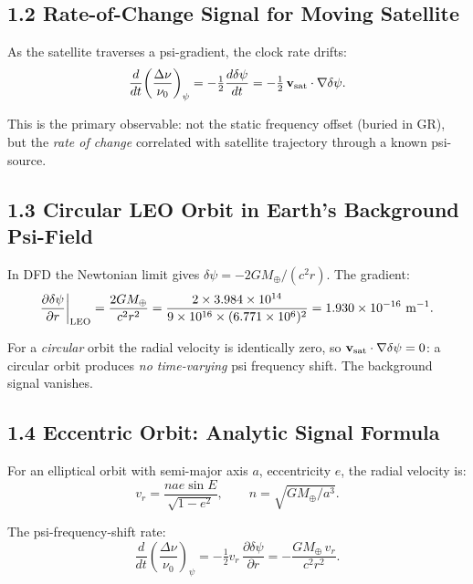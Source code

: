 \documentclass[11pt,twocolumn]{article}
\newcommand{\dpsi}{\delta\psi}
\newcommand{\vvec}{\mathbf{v}}
\newcommand{\half}{\tfrac{1}{2}}
\begin{document}
\subsection*{1.2 Rate-of-Change Signal for Moving Satellite}

As the satellite traverses a psi-gradient, the clock rate drifts:
\begin{equation}
\frac{d}{dt}\!\left(\frac{\Delta\nu}{\nu_0}\right)_\psi
= -\half\frac{d\dpsi}{dt}
= -\half\,\vvec_{\rm sat}\cdot\nabla\dpsi.
\label{eq:freq_shift_rate}
\end{equation}

This is the primary observable: not the static frequency offset (buried in
GR), but the \emph{rate of change} correlated with satellite trajectory
through a known psi-source.

\subsection*{1.3 Circular LEO Orbit in Earth's Background Psi-Field}

In DFD the Newtonian limit gives $\dpsi = -2GM_\oplus/(c^2 r)$. The
gradient:
\begin{equation}
\frac{\partial\dpsi}{\partial r}\bigg|_{\rm LEO}
= \frac{2GM_\oplus}{c^2 r^2}
= \frac{2\times3.984\times10^{14}}{9\times10^{16}\times(6.771\times10^6)^2}
= 1.930\times10^{-16}~\text{m}^{-1}.
\label{eq:earth_gradient}
\end{equation}

For a \textit{circular} orbit the radial velocity is identically zero,
so $\vvec_{\rm sat}\cdot\nabla\dpsi = 0$: a circular orbit produces
\emph{no time-varying} psi frequency shift. The background signal vanishes.

\subsection*{1.4 Eccentric Orbit: Analytic Signal Formula}

For an elliptical orbit with semi-major axis $a$, eccentricity $e$, the
radial velocity is:
\begin{equation}
v_r = \frac{na e\sin E}{\sqrt{1-e^2}},
\qquad n = \sqrt{GM_\oplus/a^3}.
\label{eq:radial_vel}
\end{equation}

The psi-frequency-shift rate:
\begin{equation}
\frac{d}{dt}\!\left(\frac{\Delta\nu}{\nu_0}\right)_\psi
= -\half v_r\,\frac{\partial\dpsi}{\partial r}
= -\frac{G M_\oplus\, v_r}{c^2 r^2}.
\label{eq:ecc_signal}
\end{equation}
\end{document}
